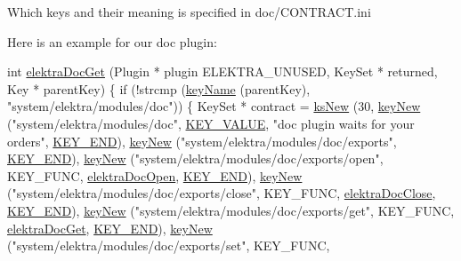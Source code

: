 Which keys and their meaning is specified in doc/\+C\+O\+N\+T\+R\+A\+C\+T.\+ini

Here is an example for our doc plugin\+:


\begin{DoxyCodeInclude}
\textcolor{keywordtype}{int} \hyperlink{group__plugin_gacb69f3441c6d84241b4362f958fbe313}{elektraDocGet} (Plugin * plugin ELEKTRA\_UNUSED, KeySet * returned, Key * parentKey)
\{
        \textcolor{keywordflow}{if} (!strcmp (\hyperlink{group__keyname_ga8e805c726a60da921d3736cda7813513}{keyName} (parentKey), \textcolor{stringliteral}{"system/elektra/modules/doc"}))
        \{
                KeySet * contract =
                        \hyperlink{group__keyset_ga671e1aaee3ae9dc13b4834a4ddbd2c3c}{ksNew} (30, \hyperlink{group__key_gad23c65b44bf48d773759e1f9a4d43b89}{keyNew} (\textcolor{stringliteral}{"system/elektra/modules/doc"}, 
      \hyperlink{group__key_gga91fb3178848bd682000958089abbaf40ac66e4a49d09212b79f5754ca6db5bd2e}{KEY\_VALUE}, \textcolor{stringliteral}{"doc plugin waits for your orders"}, \hyperlink{group__key_gga91fb3178848bd682000958089abbaf40aa8adb6fcb92dec58fb19410eacfdd403}{KEY\_END}),
                               \hyperlink{group__key_gad23c65b44bf48d773759e1f9a4d43b89}{keyNew} (\textcolor{stringliteral}{"system/elektra/modules/doc/exports"}, 
      \hyperlink{group__key_gga91fb3178848bd682000958089abbaf40aa8adb6fcb92dec58fb19410eacfdd403}{KEY\_END}),
                               \hyperlink{group__key_gad23c65b44bf48d773759e1f9a4d43b89}{keyNew} (\textcolor{stringliteral}{"system/elektra/modules/doc/exports/open"}, KEY\_FUNC, 
      \hyperlink{group__plugin_ga23c2eb3584e38a4d494eb8f91e5e3d8d}{elektraDocOpen}, \hyperlink{group__key_gga91fb3178848bd682000958089abbaf40aa8adb6fcb92dec58fb19410eacfdd403}{KEY\_END}),
                               \hyperlink{group__key_gad23c65b44bf48d773759e1f9a4d43b89}{keyNew} (\textcolor{stringliteral}{"system/elektra/modules/doc/exports/close"}, KEY\_FUNC, 
      \hyperlink{group__plugin_ga1236aefe5b2baf8b7bf636ba5aa9ea29}{elektraDocClose}, \hyperlink{group__key_gga91fb3178848bd682000958089abbaf40aa8adb6fcb92dec58fb19410eacfdd403}{KEY\_END}),
                               \hyperlink{group__key_gad23c65b44bf48d773759e1f9a4d43b89}{keyNew} (\textcolor{stringliteral}{"system/elektra/modules/doc/exports/get"}, KEY\_FUNC, 
      \hyperlink{group__plugin_gacb69f3441c6d84241b4362f958fbe313}{elektraDocGet}, \hyperlink{group__key_gga91fb3178848bd682000958089abbaf40aa8adb6fcb92dec58fb19410eacfdd403}{KEY\_END}),
                               \hyperlink{group__key_gad23c65b44bf48d773759e1f9a4d43b89}{keyNew} (\textcolor{stringliteral}{"system/elektra/modules/doc/exports/set"}, KEY\_FUNC, 

\end{DoxyCodeInclude}
